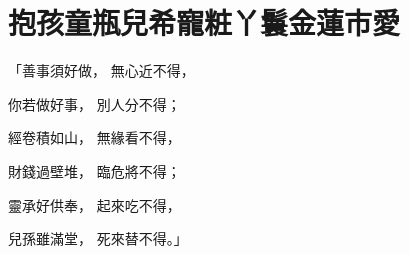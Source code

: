 %

\chapter{抱孩童瓶兒希寵\KG 粧丫鬟金蓮市愛}


「善事須好做，  無心近不得，

你若做好事，  別人分不得；

經卷積如山，  無緣看不得，

財錢過壁堆，  臨危將不得；

靈承好供奉，  起來吃不得，

兒孫雖滿堂，  死來替不得。」

